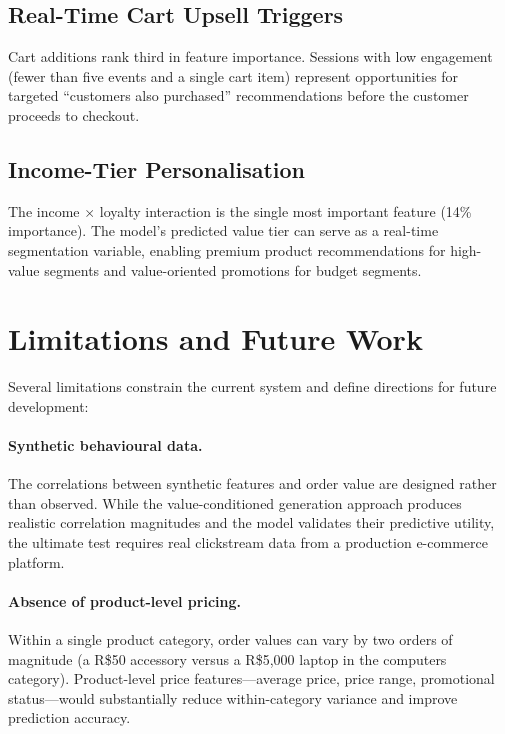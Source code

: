 \documentclass[11pt,a4paper]{article}
\begin{document}
\subsection{Real-Time Cart Upsell Triggers}

Cart additions rank third in feature importance.  Sessions with low engagement
(fewer than five events and a single cart item) represent opportunities for
targeted ``customers also purchased'' recommendations before the customer
proceeds to checkout.

\subsection{Income-Tier Personalisation}

The income $\times$ loyalty interaction is the single most important feature
(14\% importance).  The model's predicted value tier can serve as a real-time
segmentation variable, enabling premium product recommendations for high-value
segments and value-oriented promotions for budget segments.

\section{Limitations and Future Work}
\label{sec:limits}

Several limitations constrain the current system and define directions for
future development:

\paragraph{Synthetic behavioural data.}
The correlations between synthetic features and order value are designed rather
than observed.  While the value-conditioned generation approach produces
realistic correlation magnitudes and the model validates their predictive
utility, the ultimate test requires real clickstream data from a production
e-commerce platform.

\paragraph{Absence of product-level pricing.}
Within a single product category, order values can vary by two orders of
magnitude (a R\$50 accessory versus a R\$5{,}000 laptop in the computers
category).  Product-level price features---average price, price range,
promotional status---would substantially reduce within-category variance and
improve prediction accuracy.
\end{document}
